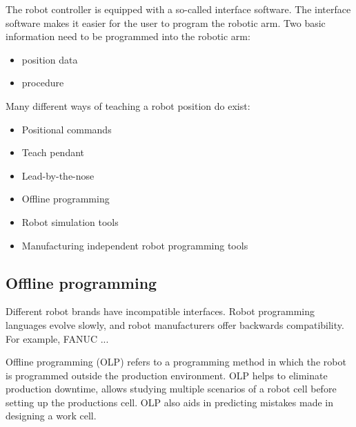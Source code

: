 The robot controller is equipped with a so-called interface software. The interface software makes it easier for the user to program the robotic arm.  
Two basic information need to be programmed into the robotic arm:

\begin{itemize}
    \item position data 
    \item procedure
\end{itemize}

Many different ways of teaching a robot position do exist:

\begin{itemize}
    \item Positional commands
    \item Teach pendant
    \item Lead-by-the-nose
    \item Offline programming
    \item Robot simulation tools
    \item Manufacturing independent robot programming tools
\end{itemize}

\subsection{Offline programming}
Different robot brands have incompatible interfaces. Robot programming languages evolve slowly, and robot manufacturers offer backwards compatibility. For example, FANUC ...

Offline programming  (OLP) refers to a programming method in which the robot is programmed outside the production environment. OLP helps to eliminate production downtime, allows studying multiple scenarios of a robot cell before setting up the productions cell. OLP also aids in predicting mistakes made in designing a work cell.
